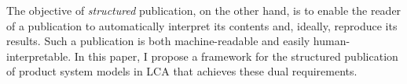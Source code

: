 The objective of \textit{structured} publication, on the other hand, is to enable the reader of a publication to automatically interpret its contents and, ideally, reproduce its results.  Such a publication is both machine-readable and easily human-interpretable.  In this paper, I propose a framework for the structured publication of product system models in LCA that achieves these dual requirements.  %
